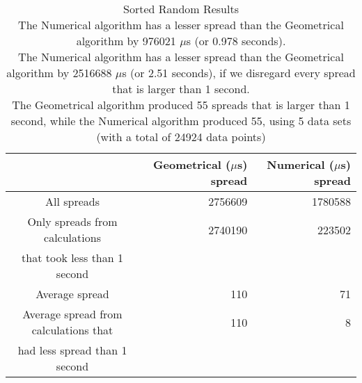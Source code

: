 \begin{table}[bth!]\footnotesize
 \begin{tabular}[3]{c|r|r}
 & Geometrical ($\mu$s) spread & Numerical ($\mu$s) spread\\
\hline
All spreads & 2756609 & 1780588 \\ 
\hline 
Only spreads from calculations & 2740190 & 223502 \\ 
that took less than 1 second & & \\ 
\hline
Average spread & 110 & 71 \\
\hline
Average spread from calculations that & 110 & 8 \\ 
had less spread than 1 second & & \\ 
\end{tabular}\\ \\
\caption{Sorted Random Results\\
The Numerical algorithm has a lesser spread than the Geometrical algorithm by 976021 $\mu$s (or 0.978 seconds).\\
The Numerical algorithm has a lesser spread than the Geometrical algorithm by 2516688 $\mu$s (or 2.51 seconds), if we disregard every spread that is larger than 1 second.\\
The Geometrical algorithm produced 55 spreads that is larger than 1 second, while the Numerical algorithm produced 55, using 5 data sets (with a total of 24924 data points)\\
}\label{random-normal_spreadtable}\end{table}